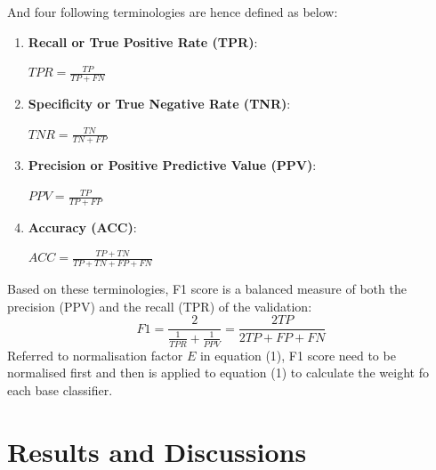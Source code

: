 \documentclass[12pt]{article}
\begin{document}
And four following terminologies are hence defined as below:
\begin{enumerate}[label=\alph*)]
\item \textbf{ Recall or True Positive Rate (TPR)}: \\ 
		\begin{center} $\displaystyle TPR = \frac{TP}{TP + FN} $ \end{center}
\item \textbf{Specificity or True Negative Rate (TNR)}: \\ 
		\begin{center} $\displaystyle TNR = \frac{TN}{TN + FP} $ \end{center}
\item \textbf{Precision or Positive Predictive Value (PPV)}: \\
		\begin{center} $\displaystyle PPV = \frac{TP}{TP + FP} $ \end{center}
\item \textbf{Accuracy (ACC)}: \\ 
		\begin{center} $\displaystyle ACC = \frac{TP + TN}{TP + TN + FP + FN} $\\ \end{center} 
\end{enumerate}

Based on these terminologies, F1 score is a balanced measure of both the precision (PPV) and the recall (TPR) of the validation: 
\begin{equation}\label{reio}
	F1 = \frac{2 }{\frac{1}{TPR} + \frac{1}{PPV}} = \frac{2TP}{2TP + FP + FN}
\end{equation}
Referred to normalisation factor $E$ in equation (1), F1 score need to be normalised first and then is applied to equation (1) to calculate the weight fo each base classifier. 
\\
\bigskip
\goodbreak

\section{Results and Discussions}
\end{document}
